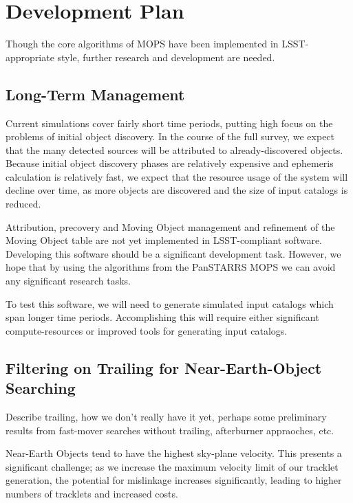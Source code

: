\documentclass[12pt,preprint]{aastex}
\begin{document}
\section{Development Plan}

Though the core algorithms of MOPS have been implemented in
LSST-appropriate style, further research and development are needed.



\subsection{Long-Term Management}

Current simulations cover fairly short time periods, putting high
focus on the problems of initial object discovery.  In the course of
the full survey, we expect that the many detected sources will be
attributed to already-discovered objects.  Because initial object
discovery phases are relatively expensive and ephemeris calculation is
relatively fast, we expect that the resource usage of the system will
decline over time, as more objects are discovered and the size of
input catalogs is reduced.

Attribution, precovery and Moving Object management and refinement of the
Moving Object table are not yet implemented in LSST-compliant software.
Developing this software should be a significant development task.
However, we hope that by using the algorithms from the PanSTARRS MOPS
we can avoid any significant research tasks.

To test this software, we will need to generate simulated input
catalogs which span longer time periods.  Accomplishing this will
require either significant compute-resources or improved tools for
generating input catalogs.



\subsection{Filtering on Trailing for Near-Earth-Object Searching}

\label{neosTrailing}

Describe trailing, how we don't really have it yet, perhaps some
preliminary results from fast-mover searches without trailing,
afterburner appraoches, etc.

Near-Earth Objects tend to have the highest sky-plane velocity.  This
presents a significant challenge; as we increase the maximum velocity
limit of our tracklet generation, the potential for mislinkage
increases significantly, leading to higher numbers of tracklets and
increased costs.  
\end{document}
